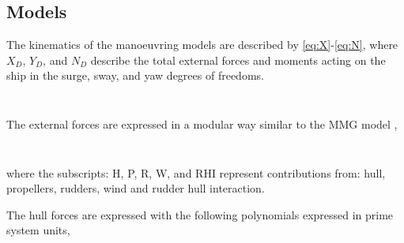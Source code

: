 \subsection{Models}
\label{sec:models}
The kinematics of the manoeuvring models are described by \autoref{eq:X}-\autoref{eq:N}, where $X_D$, $Y_D$, and $N_D$ describe the total external forces and moments acting on the ship in the surge, sway, and yaw degrees of freedoms.
\begin{equation}
    \label{eq:X}
    
\end{equation}

\begin{equation}
    \label{eq:Y}
    
\end{equation}

\begin{equation}
    \label{eq:N}
    
\end{equation}

The external forces are expressed in a modular way similar to the MMG model \citep{yasukawa_introduction_2015},

\begin{equation}
    \label{eq:X_D}
    
\end{equation}

\begin{equation}
    \label{eq:Y_D}
    
\end{equation}

\begin{equation}
    \label{eq:N_D}
    
\end{equation}
where the subscripts: H, P, R, W, and RHI represent contributions from: hull, propellers, rudders, wind and rudder hull interaction.

The hull forces are expressed with the following polynomials expressed in prime system units,

\begin{equation}
    \label{eq:X_H}
    
\end{equation}

\begin{equation}
    \label{eq:Y_H}
    
\end{equation}

